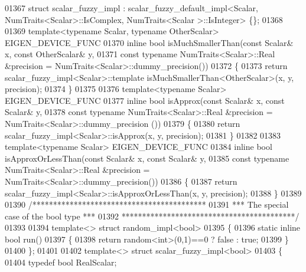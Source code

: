 \begin{DoxyCode}
01367 \textcolor{keyword}{struct }scalar\_fuzzy\_impl : scalar\_fuzzy\_default\_impl<Scalar, NumTraits<Scalar>::IsComplex, NumTraits<Scalar
      >::IsInteger> \{\};
01368 
01369 \textcolor{keyword}{template}<\textcolor{keyword}{typename} Scalar, \textcolor{keyword}{typename} OtherScalar> EIGEN\_DEVICE\_FUNC
01370 \textcolor{keyword}{inline} \textcolor{keywordtype}{bool} isMuchSmallerThan(\textcolor{keyword}{const} Scalar& x, \textcolor{keyword}{const} OtherScalar& y,
01371                               \textcolor{keyword}{const} \textcolor{keyword}{typename} NumTraits<Scalar>::Real &precision = 
      NumTraits<Scalar>::dummy\_precision())
01372 \{
01373   \textcolor{keywordflow}{return} scalar\_fuzzy\_impl<Scalar>::template isMuchSmallerThan<OtherScalar>(x, y, precision);
01374 \}
01375 
01376 \textcolor{keyword}{template}<\textcolor{keyword}{typename} Scalar> EIGEN\_DEVICE\_FUNC
01377 \textcolor{keyword}{inline} \textcolor{keywordtype}{bool} isApprox(\textcolor{keyword}{const} Scalar& x, \textcolor{keyword}{const} Scalar& y,
01378                      \textcolor{keyword}{const} \textcolor{keyword}{typename} NumTraits<Scalar>::Real &precision = NumTraits<Scalar>::dummy\_precision
      ())
01379 \{
01380   \textcolor{keywordflow}{return} scalar\_fuzzy\_impl<Scalar>::isApprox(x, y, precision);
01381 \}
01382 
01383 \textcolor{keyword}{template}<\textcolor{keyword}{typename} Scalar> EIGEN\_DEVICE\_FUNC
01384 \textcolor{keyword}{inline} \textcolor{keywordtype}{bool} isApproxOrLessThan(\textcolor{keyword}{const} Scalar& x, \textcolor{keyword}{const} Scalar& y,
01385                                \textcolor{keyword}{const} \textcolor{keyword}{typename} NumTraits<Scalar>::Real &precision = 
      NumTraits<Scalar>::dummy\_precision())
01386 \{
01387   \textcolor{keywordflow}{return} scalar\_fuzzy\_impl<Scalar>::isApproxOrLessThan(x, y, precision);
01388 \}
01389 
01390 \textcolor{comment}{/******************************************}
01391 \textcolor{comment}{***  The special case of the  bool type ***}
01392 \textcolor{comment}{******************************************/}
01393 
01394 \textcolor{keyword}{template}<> \textcolor{keyword}{struct }random\_impl<bool>
01395 \{
01396   \textcolor{keyword}{static} \textcolor{keyword}{inline} \textcolor{keywordtype}{bool} run()
01397   \{
01398     \textcolor{keywordflow}{return} random<int>(0,1)==0 ? \textcolor{keyword}{false} : \textcolor{keyword}{true};
01399   \}
01400 \};
01401 
01402 \textcolor{keyword}{template}<> \textcolor{keyword}{struct }scalar\_fuzzy\_impl<bool>
01403 \{
01404   \textcolor{keyword}{typedef} \textcolor{keywordtype}{bool} RealScalar;

\end{DoxyCode}
